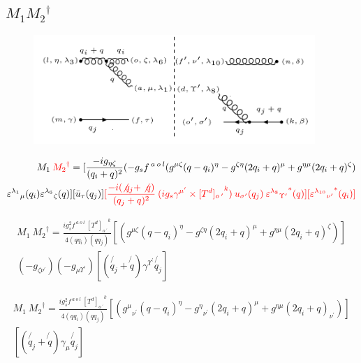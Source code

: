 \subsection{$M_1 {M_2}^{\dagger}$}
\begin{figure}[ht!]
\centering
\includegraphics[width=0.95\textwidth]{images/ggqM1M2dagger.png}
\end{figure}
\begin{equation}
\begin{split}
M_1\:{\color[RGB]{255,0,0} {M_2}^{\dagger}}=[\frac{-ig_{{\eta}{\zeta}}}{(q_i +q)^2}(-g_s f^{\:a\:o\:l}(g^{{\mu}{\zeta}}(q-q_i)^{\eta}-g^{{\zeta}{\eta}}(2q_i +q)^{\mu}+g^{{\eta}{\mu}}(2q_i +q)^{\zeta})\\
{\varepsilon^{\lambda_1}}_{\mu} (q_i) {\varepsilon^{\lambda_6}}_{\zeta} (q)][\bar{u}_{\tau}(q_j)]
{\color[RGB]{255,0,0}[\frac{-i(\not{q_j} + \not{q})}{(q_j + q)^2} \:  (ig_s \gamma^{{\mu}^{\prime}}\times {[T^d]_{o\:^{\prime}}}^k) \: u_{{\sigma}^{\prime}}(q_j) \: {{\varepsilon^{\lambda_8}}_{{\Upsilon}^{\prime}}}^* (q)][{{\varepsilon^{\lambda_{10}}}_{{\nu}^{\prime}}}^* (q_i)]}
\end{split}
\end{equation}


\begin{equation}
\begin{split}
M_1\:{M_2}^{\dagger}=\frac{ig_s ^2 f^{\:a\:o\:l}\: {[T^d]_{o\:^{\prime}}}^k}{4(qq_i)(qq_j)}
[(g^{{\mu}{\zeta}}(q-q_i)^{\eta}-g^{{\zeta}{\eta}}(2q_i +q)^{\mu}+g^{{\eta}{\mu}}(2q_i +q)^{\zeta})]\\
(-g_{{{\zeta}}{{\nu}^{\prime}}})(-g_{{\mu}{{\Upsilon}^{\prime}}})[(\not{q_j} + \not{q})\gamma^{{\Upsilon}^{\prime}}\not{q_j}]
\end{split}
\end{equation}

\begin{equation}
\begin{split}
M_1\:{M_2}^{\dagger}=\frac{ig_s ^2 f^{\:a\:o\:l}\: {[T^d]_{o\:^{\prime}}}^k}{4(qq_i)(qq_j)}
[({g^{{\mu}}}_{{\nu}^{\prime}}(q-q_i)^{\eta}-{g^{{\eta}}}_{{\nu}^{\prime}}(2q_i +q)^{\mu}+g^{{\eta}{\mu}}(2q_i +q)_{{\nu}^{\prime}})]\\
[(\not{q_j} + \not{q})\gamma_{{\mu}}\not{q_j}]
\end{split}
\end{equation}


